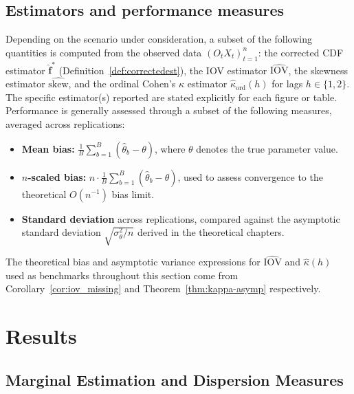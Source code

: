 ﻿\documentclass[12pt,a4paper]{scrreprt}
\theoremstyle{definition}
\begin{document}
\subsection*{Estimators and performance measures}
Depending on the scenario under consideration, a subset of the 
following quantities is computed from the observed data 
$(O_t X_t)_{t=1}^n$: the corrected CDF estimator 
$\hat{\boldsymbol{f}}^*$ (Definition~\ref{def:correctedest}), the 
IOV estimator $\widehat{\mathrm{IOV}}$, the skewness estimator 
$\widehat{\mathrm{skew}}$, and the ordinal Cohen's $\kappa$ estimator 
$\hat{\kappa}_{\mathrm{ord}}(h)$ for lags $h \in \{1, 2\}$. The 
specific estimator(s) reported are stated explicitly for each 
figure or table.\\
Performance is generally assessed through a subset of the following 
measures, averaged across replications:
\begin{itemize}
    \item \textbf{Mean bias:} $\frac{1}{B}\sum_{b=1}^B 
    (\hat{\theta}_b - \theta)$, where $\theta$ denotes the true 
    parameter value.
    \item \textbf{$n$-scaled bias:} $n \cdot \frac{1}{B}\sum_{b=1}^B 
    (\hat{\theta}_b - \theta)$, used to assess convergence to the 
    theoretical $O(n^{-1})$ bias limit.
    \item \textbf{Standard deviation} across replications, compared 
    against the asymptotic standard deviation 
    $\sqrt{\sigma^2_\theta / n}$ derived in the theoretical chapters.
\end{itemize}
The theoretical bias and asymptotic variance expressions for  $\widehat{\mathrm{IOV}}$ and $\hat{\kappa}(h)$ used as 
benchmarks throughout this section come from Corollary~\ref{cor:iov_missing} and Theorem~\ref{thm:kappa-asymp} respectively. 
\section{Results}
\label{sec:sim-results}

\subsection{Marginal Estimation and Dispersion Measures}
\label{sec:sim-marginal}
\end{document}
